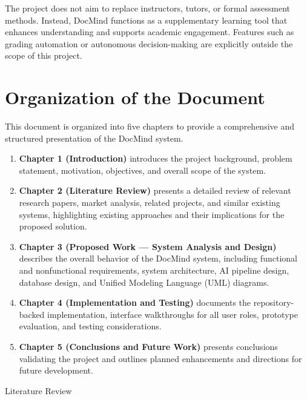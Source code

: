 \documentclass[12pt, a4paper, oneside]{report}
\makeatletter
\newcommand{\chapformat}[1]{%
  \centering
  {\fontsize{14}{17}\selectfont\itshape\addfontfeatures{LetterSpace=3.5}%
    \MakeUppercase{\chaptertitlename}\ \thechapter}\\[24pt]%
  {\fontsize{16}{19}\selectfont\bfseries\addfontfeatures{LetterSpace=0}%
    \MakeUppercase{#1}}%
}
\newcommand{\chapformatstar}[1]{%
  \centering
  {\fontsize{16}{19}\selectfont\bfseries\MakeUppercase{#1}}%
}
\newcommand{\chapterstar}[1]{%
  \clearpage
  \phantomsection
  \edef\@saved@chapcount{\the\value{chapter}}%
  \titleformat{\chapter}[block]{}{}%
    {0pt}{\chapformatstar}%
  \@originalchapter*{#1}%
  \setcounter{chapter}{\@saved@chapcount}%
  \titleformat{\chapter}[block]{}{}%
    {0pt}{\chapformat}%
}
\let\@originalchapter\chapter
\renewcommand{\chapter}{%
  \@ifstar{\chapterstar}{\@originalchapter}%
}
\let\oldsection\section
\renewcommand{\section}{%
  \addtocontents{toc}{\protect\needspace{4\baselineskip}}%
  \oldsection
}
\makeatother
\begin{document}
The project does not aim to replace instructors, tutors, or formal assessment methods. Instead, DocMind functions as a supplementary learning tool that enhances understanding and supports academic engagement. Features such as grading automation or autonomous decision-making are explicitly outside the scope of this project.

\newpage

\section{Organization of the Document}

This document is organized into five chapters to provide a comprehensive and structured presentation of the DocMind system.

\begin{enumerate}
  \item \textbf{Chapter 1 (Introduction)} introduces the project background, problem statement, motivation, objectives, and overall scope of the system.
  \item \textbf{Chapter 2 (Literature Review)} presents a detailed review of relevant research papers, market analysis, related projects, and similar existing systems, highlighting existing approaches and their implications for the proposed solution.
  \item \textbf{Chapter 3 (Proposed Work --- System Analysis and Design)} describes the overall behavior of the DocMind system, including functional and nonfunctional requirements, system architecture, AI pipeline design, database design, and Unified Modeling Language (UML) diagrams.
  \item \textbf{Chapter 4 (Implementation and Testing)} documents the repository-backed implementation, interface walkthroughs for all user roles, prototype evaluation, and testing considerations.
  \item \textbf{Chapter 5 (Conclusions and Future Work)} presents conclusions validating the project and outlines planned enhancements and directions for future development.
\end{enumerate}

\chapter{Literature Review}
\end{document}
